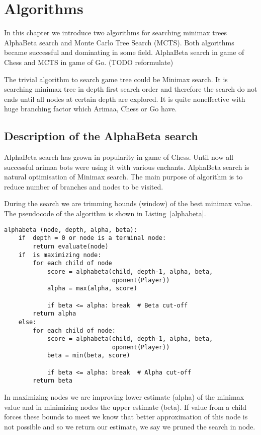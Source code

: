 \chapter{Algorithms}
In this chapter we introduce two algorithms for searching minimax trees
AlphaBeta search and Monte Carlo Tree Search (MCTS). Both algorithms became
successful and dominating in some field. AlphaBeta search in game of Chess and
MCTS in game of Go. (TODO reformulate)

The trivial algorithm to search game tree could be Minimax search. It is
searching minimax tree in depth first search order and therefore the search do
not ends until all nodes at certain depth are explored. It is quite
noneffective with huge branching factor which Arimaa, Chess or Go have.

\section{Description of the AlphaBeta search}
AlphaBeta search has grown in popularity in game of Chess. Until now all
successful arimaa bots were using it with various enchants. AlphaBeta search is
natural optimisation of Minimax search. The main purpose of algorithm is to
reduce number of branches and nodes to be visited.

During the search we are trimming bounds (window) of the best minimax value.
The pseudocode of the algorithm is shown in Listing~\ref{alphabeta}.

\lstset{language=Python, caption=Pseudocode of the AlphaBeta search, label=alphabeta}
\begin{lstlisting}
alphabeta (node, depth, alpha, beta):
    if  depth = 0 or node is a terminal node:
        return evaluate(node)
    if  is maximizing node:
        for each child of node
            score = alphabeta(child, depth-1, alpha, beta,
                              oponent(Player))
            alpha = max(alpha, score)

            if beta <= alpha: break  # Beta cut-off
        return alpha
    else:
        for each child of node:
            score = alphabeta(child, depth-1, alpha, beta,
                              oponent(Player))
            beta = min(beta, score)

            if beta <= alpha: break  # Alpha cut-off
        return beta
\end{lstlisting}

In maximizing nodes we are improving lower estimate (alpha) of the minimax
value and in minimizing nodes the upper estimate (beta). If value from a child
forces these bounds to meet we know that better approximation of this node is
not possible and so we return our estimate, we say we pruned the search in
node.

